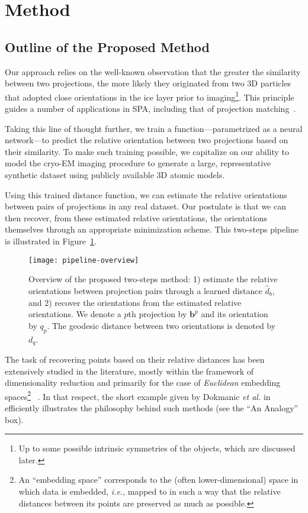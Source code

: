 \section{Method}

\subsection{Outline of the Proposed Method}

Our approach relies on the well-known observation that the greater the similarity between two projections, the more likely they originated from two 3D particles that adopted close orientations in the ice layer prior to imaging\footnote{Up to some possible intrinsic symmetries of the objects, which are discussed later.}. This principle guides a number of applications in SPA, including that of projection matching~\cite{penczek1994ribosome}.

Taking this line of thought further, we train a function---parametrized as a neural network---to predict the relative orientation between two projections based on their similarity. To make such training possible, we capitalize on our ability to model the cryo-EM imaging procedure to generate a large, representative synthetic dataset using publicly available 3D atomic models.

Using this trained distance function, we can estimate the relative orientations between pairs of projections in any real dataset. Our postulate is that we can then recover, from these estimated relative orientations, the orientations themselves through an appropriate minimization scheme. This two-steps pipeline is illustrated in Figure~\ref{fig:overview-pipeline}.

\begin{figure}
    \centering
    \texttt{[image: pipeline-overview]}
    \caption{Overview of the proposed two-steps method: 1) estimate the relative orientations between projection pairs through a learned distance $\widehat{d}_b$, and 2) recover the orientations from the estimated relative orientations. We denote a $p$th projection by $\mathbf{b}^p$ and its orientation by $q_p$. The geodesic distance between two orientations is denoted by $d_q$.}
    \label{fig:overview-pipeline}
\end{figure}

The task of recovering points based on their relative distances has been extensively studied in the literature, mostly within the framework of dimensionality reduction and primarily for the case of \textit{Euclidean} embedding spaces\footnote{An ``embedding space'' corresponds to the (often lower-dimensional) space in which data is embedded, \textit{i.e.}, mapped to in such a way that the relative distances between its points are preserved as much as possible.}~\cite{belkin2003laplacian,kruskal1978multidimensional, maaten2008visualizing, mcinnes2018umap,dokmanic2015euclidean} . In that respect, the short example given by Dokmanic \textit{et al.} in~\cite{dokmanic2015euclidean} efficiently illustrates the philosophy behind such methods (see the ``An Analogy'' box).

